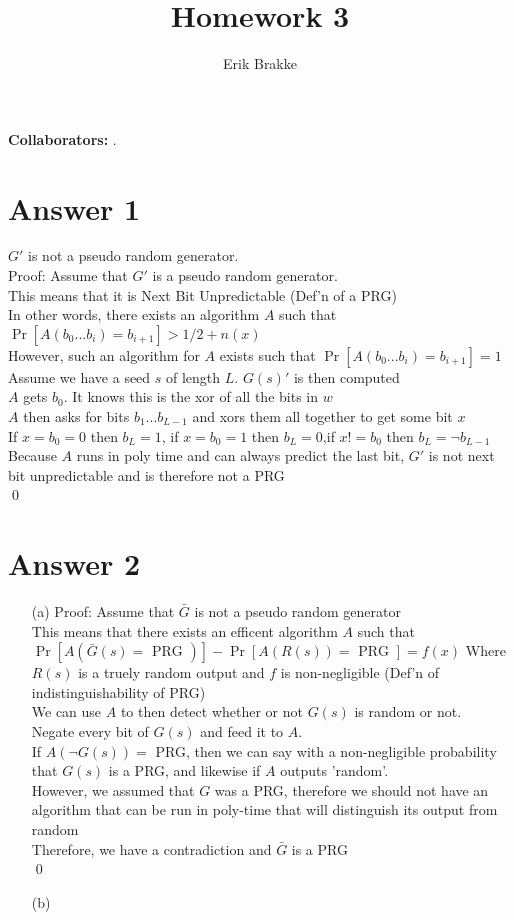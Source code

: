 \documentclass[11pt]{article}
\providecommand{\myparab}[1]{\smallskip\noindent\textbf{#1} }
\theoremstyle{definition}
\begin{document}
\title{Homework 3}
\author{Erik Brakke}
\maketitle

\thispagestyle{fancy}

\myparab{Collaborators: }  .
 
 
\section*{Answer 1}
$G'$ is not a pseudo random generator.\\
Proof: Assume that $G'$ is a pseudo random generator.\\
This means that it is Next Bit Unpredictable (Def'n of a PRG)\\
In other words, there exists an algorithm $A$ such that $\Pr[A(b_0...b_i) = b_{i+1}] > 1/2 + n(x)$\\
However, such an algorithm for $A$ exists such that $\Pr[A(b_0...b_i) = b_{i+1}] = 1$\\
Assume we have a seed $s$ of length $L$.  $G(s)'$ is then computed\\
$A$ gets $b_0$.  It knows this is the xor of all the bits in $w$\\
$A$ then asks for bits $b_1...b_{L-1}$ and xors them all together to get some bit $x$\\
If $x = b_0 = 0$ then $b_L = 1$, if $x = b_0 = 1$ then $b_L = 0$,if $x != b_0$ then $b_L = \neg b_{L-1}$\\
Because $A$ runs in poly time and can always predict the last bit, $G'$ is not next bit unpredictable and is therefore not a PRG\\
\qed

\section*{Answer 2}
\begin{enumerate}
	\item[(a)]
	Proof: Assume that $\bar{G}$ is not a pseudo random generator\\
	This means that there exists an efficent algorithm $A$ such that $\Pr[A(\bar{G}(s) = \text{ PRG })] - \Pr[A(R(s)) = \text{ PRG }] = f(x)$ Where $R(s)$ is a truely random output and $f$ is non-negligible  (Def'n of indistinguishability of PRG)\\
	We can use $A$ to then detect whether or not $G(s)$ is random or not.\\
	Negate every bit of $G(s)$ and feed it to $A$.\\
	If $A(\neg G(s)) =$ PRG, then we can say with a non-negligible probability that $G(s)$ is a PRG, and likewise if $A$ outputs 'random'.\\
	However, we assumed that $G$ was a PRG, therefore we should not have an algorithm that can be run in poly-time that will distinguish its output from random\\
	Therefore, we have a contradiction and $\bar{G}$ is a PRG\\
	\qed

	\item[(b)]
\end{enumerate}
\end{document}
